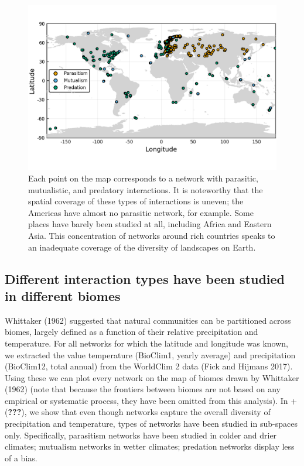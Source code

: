 \documentclass[11pt]{article}
\begin{document}
\begin{figure}
\hypertarget{fig:spatial}{%
\centering
\includegraphics{figures/map_networks_type.png}
\caption{Each point on the map corresponds to a network with parasitic,
mutualistic, and predatory interactions. It is noteworthy that the
spatial coverage of these types of interactions is uneven; the Americas
have almost no parasitic network, for example. Some places have barely
been studied at all, including Africa and Eastern Asia. This
concentration of networks around rich countries speaks to an inadequate
coverage of the diversity of landscapes on Earth.}\label{fig:spatial}
}
\end{figure}

\hypertarget{different-interaction-types-have-been-studied-in-different-biomes}{%
\subsection{Different interaction types have been studied in different
biomes}\label{different-interaction-types-have-been-studied-in-different-biomes}}

Whittaker (1962) suggested that natural communities can be partitioned
across biomes, largely defined as a function of their relative
precipitation and temperature. For all networks for which the latitude
and longitude was known, we extracted the value temperature (BioClim1,
yearly average) and precipitation (BioClim12, total annual) from the
WorldClim 2 data (Fick and Hijmans 2017). Using these we can plot every
network on the map of biomes drawn by Whittaker (1962) (note that
because the frontiers between biomes are not based on any empirical or
systematic process, they have been omitted from this analysis). In
+({\textbf{???}}), we show that even though networks capture the overall
diversity of precipitation and temperature, types of networks have been
studied in sub-spaces only. Specifically, parasitism networks have been
studied in colder and drier climates; mutualism networks in wetter
climates; predation networks display less of a bias.
\end{document}
